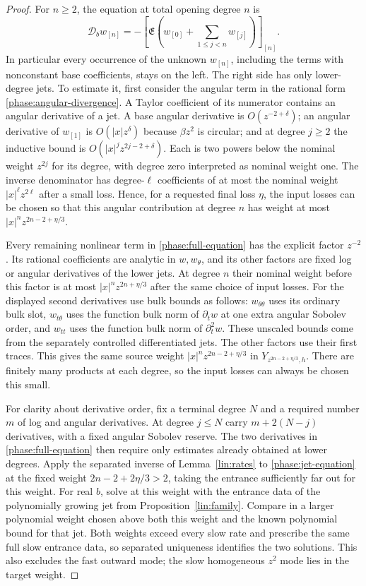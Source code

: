 \begin{proof}
For $n\ge2$, the equation at total opening degree $n$ is
\begin{equation}
 \mathcal D_b w_{[n]}
 =-\left[\mathfrak E\left(w_{[0]}+
                    \sum_{1\le j<n}w_{[j]}\right)\right]_{[n]}.
 \label{phase:jet-equation}
\end{equation}
In particular every occurrence of the unknown $w_{[n]}$, including
the terms with nonconstant base coefficients, stays on the left.
The right side has only lower-degree jets.  To estimate it, first
consider the angular term in the rational form
\eqref{phase:angular-divergence}.  A Taylor coefficient of its
numerator contains an angular derivative of a jet.  A base angular
derivative is $O(z^{-2+\delta})$; an angular derivative of $w_{[1]}$
is $O(|x|z^\delta)$ because $\beta z^2$ is circular; and at degree
$j\ge2$ the inductive bound is $O(|x|^jz^{2j-2+\delta})$.
Each is two powers below the nominal weight $z^{2j}$ for its degree,
with degree zero interpreted as nominal weight one.  The inverse
denominator has degree-$\ell$ coefficients of at most the nominal weight
$|x|^\ell z^{2\ell}$ after a small loss.  Hence, for a requested final loss
$\eta$, the input losses can be chosen so that this angular contribution
at degree $n$ has weight at most $|x|^n z^{2n-2+\eta/3}$.

Every remaining nonlinear term in \eqref{phase:full-equation} has the
explicit factor $z^{-2}$.  Its rational coefficients are analytic in
$w,w_\theta$, and its other factors are fixed log or angular derivatives
of the lower jets.  At degree $n$ their nominal weight before this
factor is at most $|x|^n z^{2n+\eta/3}$ after the same choice of input
losses.  For the displayed second derivatives use bulk bounds as follows:
$w_{\theta\theta}$ uses its ordinary bulk slot, $w_{t\theta}$ uses
the function bulk norm of $\partial_t w$ at one extra angular Sobolev
order, and $w_{tt}$ uses the function bulk norm of $\partial_t^2w$.
These unscaled bounds come from the separately controlled differentiated
jets.  The other factors use their first traces.  This gives the same
source weight $|x|^n z^{2n-2+\eta/3}$ in
$Y_{z^{2n-2+\eta/3},h}$.  There are finitely many products at each
degree, so the input losses can always be chosen this small.

For clarity about derivative order, fix a terminal degree $N$ and a
required number $m$ of log and angular derivatives.  At degree $j\le N$
carry $m+2(N-j)$ derivatives, with a fixed angular Sobolev reserve.
The two derivatives in \eqref{phase:full-equation} then require only
estimates already obtained at lower degrees.  Apply the separated
inverse of Lemma~\ref{lin:rates} to \eqref{phase:jet-equation} at the
fixed weight $2n-2+2\eta/3>2$, taking the entrance sufficiently far out
for this weight.  For real $b$, solve at this weight with
the entrance data of the polynomially growing jet from
Proposition~\ref{lin:family}.  Compare in a larger polynomial weight
chosen above both this weight and the known polynomial bound for that
jet.  Both weights exceed every slow rate and prescribe the same full
slow entrance data, so separated uniqueness identifies the two
solutions.  This also excludes the fast outward mode; the slow
homogeneous $z^2$ mode lies in the target weight.


\end{proof}

